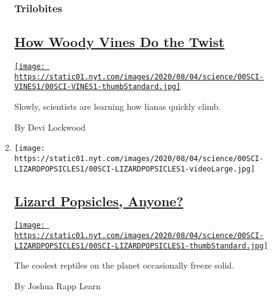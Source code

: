 \begin{enumerate}
\begin{enumerate}
    \hypertarget{trilobites}{%
    \subsubsection{Trilobites}\label{trilobites}}

    \hypertarget{how-woody-vines-do-the-twist}{%
    \subsection{\texorpdfstring{\href{/2020/08/01/science/vines-lianas-panama.html}{How
    Woody Vines Do the
    Twist}}{How Woody Vines Do the Twist}}\label{how-woody-vines-do-the-twist}}

    \href{/2020/08/01/science/vines-lianas-panama.html}{\texttt{[image: https://static01.nyt.com/images/2020/08/04/science/00SCI-VINES1/00SCI-VINES1-thumbStandard.jpg]}}

    Slowly, scientists are learning how lianas quickly climb.

    By Devi Lockwood
  \item
    \texttt{[image: https://static01.nyt.com/images/2020/08/04/science/00SCI-LIZARDPOPSICLES1/00SCI-LIZARDPOPSICLES1-videoLarge.jpg]}

    \hypertarget{lizard-popsicles-anyone}{%
    \subsection{\texorpdfstring{\href{/2020/07/31/science/lizards-liolaemus-argentina.html}{Lizard
    Popsicles,
    Anyone?}}{Lizard Popsicles, Anyone?}}\label{lizard-popsicles-anyone}}

    \href{/2020/07/31/science/lizards-liolaemus-argentina.html}{\texttt{[image: https://static01.nyt.com/images/2020/08/04/science/00SCI-LIZARDPOPSICLES1/00SCI-LIZARDPOPSICLES1-thumbStandard.jpg]}}

    The coolest reptiles on the planet occasionally freeze solid.

    By Joshua Rapp Learn
  \end{enumerate}
\end{enumerate}

